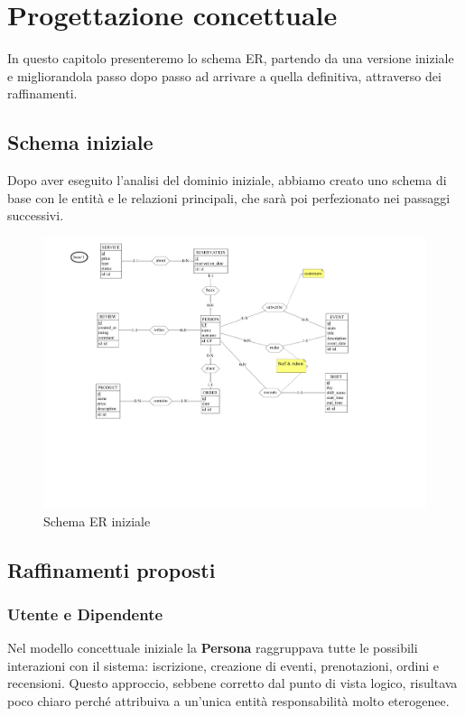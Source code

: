 \documentclass[a4paper,12pt]{report}
\begin{document}
\chapter{Progettazione concettuale}
In questo capitolo presenteremo lo schema ER, partendo da una versione iniziale e migliorandola 
passo dopo passo ad arrivare a quella definitiva, attraverso dei raffinamenti.

\section{Schema iniziale}
Dopo aver eseguito l'analisi del dominio iniziale, abbiamo creato uno schema di base con
le entità e le relazioni principali, che sarà poi perfezionato nei passaggi successivi.
\begin{figure}[H]
	\centering
	\includegraphics[width=\textwidth, trim=60pt 150pt 170pt 0 , clip]{./schemas/base.pdf}
	\caption{Schema ER iniziale}
	\label{fig:schema-iniziale}
\end{figure}

\section{Raffinamenti proposti}
\subsection{Utente e Dipendente}
Nel modello concettuale iniziale la \textbf{Persona} raggruppava tutte le possibili interazioni 
con il sistema: iscrizione, creazione di eventi, prenotazioni, ordini e recensioni. Questo 
approccio, sebbene corretto dal punto di vista logico, risultava poco chiaro perché attribuiva 
a un'unica entità responsabilità molto eterogenee.
\end{document}
